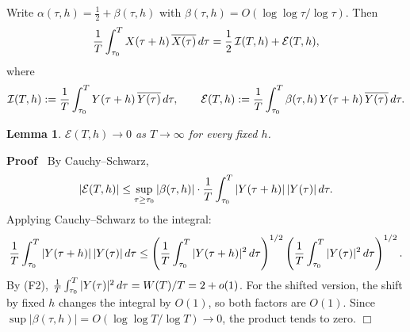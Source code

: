 \documentclass{article}
\newcommand{\assign}{:=}
\newenvironment{proof}{\noindent\textbf{Proof\ }}{\hspace*{\fill}$\Box$\medskip}
\newtheorem{lemma}{Lemma}
\begin{document}
Write $\alpha (\tau, h) = \frac{1}{2} + \beta (\tau, h)$ with $\beta (\tau, h)
= O (\log \log \tau / \log \tau)$. Then
\begin{equation}
  \label{eq:split} \frac{1}{T}  \int_{\tau_0}^T X (\tau + h) \hspace{0.17em}
  \overline{X (\tau)} \hspace{0.17em} d \tau = \frac{1}{2}  \hspace{0.17em}
  \mathcal{I} (T, h) +\mathcal{E} (T, h),
\end{equation}
where
\[ \mathcal{I} (T, h) \assign \frac{1}{T}  \int_{\tau_0}^T Y (\tau + h)
   \hspace{0.17em} \overline{Y (\tau)} \hspace{0.17em} d \tau, \qquad
   \mathcal{E} (T, h) \assign \frac{1}{T}  \int_{\tau_0}^T \beta (\tau, h) 
   \hspace{0.17em} Y (\tau + h) \hspace{0.17em} \overline{Y (\tau)}
   \hspace{0.17em} d \tau . \]
\begin{lemma}
  \label{lem:error-vanishes}$\mathcal{E} (T, h) \to 0$ as $T \to \infty$ for
  every fixed $h$.
\end{lemma}

\begin{proof}
  By Cauchy--Schwarz,
  \[ |\mathcal{E}(T, h) | \le \sup_{\tau \ge \tau_0} | \beta (\tau, h) | \cdot
     \frac{1}{T}  \int_{\tau_0}^T |Y (\tau + h) | \hspace{0.17em} |Y (\tau) | 
     \hspace{0.17em} d \tau . \]
  Applying Cauchy--Schwarz to the integral:
  \[ \frac{1}{T}  \int_{\tau_0}^T |Y (\tau + h) | \hspace{0.17em} |Y (\tau) | 
     \hspace{0.17em} d \tau \le \left( \frac{1}{T}  \int_{\tau_0}^T |Y (\tau +
     h) |^2  \hspace{0.17em} d \tau \right)^{1 / 2}  \left( \frac{1}{T} 
     \int_{\tau_0}^T |Y (\tau) |^2  \hspace{0.17em} d \tau \right)^{1 / 2} .
  \]
  By (F2), $\frac{1}{T}  \int_{\tau_0}^T |Y (\tau) |^2  \hspace{0.17em} d \tau
  = W (T) / T = 2 + o (1)$. For the shifted version, the shift by fixed $h$
  changes the integral by $O (1)$, so both factors are $O (1)$. Since $\sup |
  \beta (\tau, h) | = O (\log \log T / \log T) \to 0$, the product tends to
  zero.
\end{proof}
\end{document}
